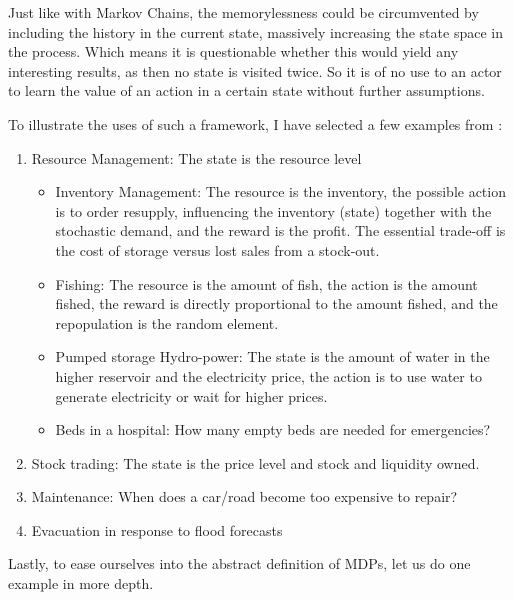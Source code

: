 Just like with Markov Chains, the memorylessness could be circumvented by including the history in the current state, massively increasing the state space in the process. Which means it is questionable whether this would yield any interesting results, as then no state is visited twice. So it is of no use to an actor to learn the value of an action in a certain state without further assumptions.

To illustrate the uses of such a framework, I have selected a few examples from \textcite{whiteRealApplicationsMarkov1985}:
\begin{enumerate}
	\item Resource Management: The state is the resource level
	\begin{itemize}
		\item Inventory Management: The resource is the inventory, the possible action is to order resupply, influencing the inventory (state) together with the stochastic demand, and the reward is the profit. The essential trade-off is the cost of storage versus lost sales from a stock-out.
		\item Fishing: The resource is the amount of fish, the action is the amount fished, the reward is directly proportional to the amount fished, and the repopulation is the random element.
		\item Pumped storage Hydro-power: The state is the amount of water in the higher reservoir and the electricity price, the action is to use water to generate electricity or wait for higher prices.
		\item Beds in a hospital: How many empty beds are needed for emergencies?
	\end{itemize}
	\item Stock trading: The state is the price level and stock and liquidity owned.
	\item Maintenance: When does a car/road become too expensive to repair?
	\item Evacuation in response to flood forecasts
\end{enumerate}
Lastly, to ease ourselves into the abstract definition of MDPs, let us do one example in more depth.
